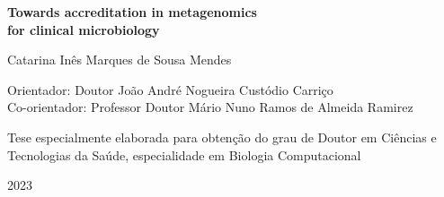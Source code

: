 \begin{titlepage}
\begin{center}
        \vspace{1cm}

        \huge
        \textbf{Towards accreditation in metagenomics \\[1ex] for clinical microbiology}
        \normalsize
        
        \vspace{1cm}
        
        \large
        Catarina Inês Marques de Sousa Mendes
        \normalsize
        
        \vspace{1cm}
        
        Orientador: Doutor João André Nogueira Custódio Carriço\\
        Co-orientador: Professor Doutor Mário Nuno Ramos de Almeida Ramirez
        
        \vfill
        
        Tese especialmente elaborada para obtenção do grau de Doutor em Ciências e Tecnologias da Saúde, especialidade em Biologia Computacional\\
        
        \vspace{0.8cm}
        
        2023
        
    \end{center}
\end{titlepage}